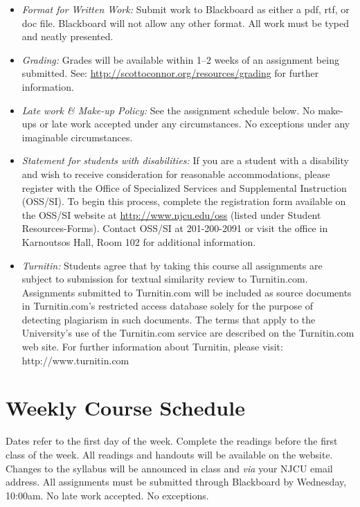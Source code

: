 \documentclass[article,oneside]{memoir}
\begin{document}
\begin{itemize}
\item \textit{Format for Written Work:} Submit work to Blackboard as either a pdf, rtf, or doc file. Blackboard will not allow any other format. All work must be typed and neatly presented. 


\item \textit{Grading:} Grades will be available within 1--2 weeks of an assignment being submitted. See: \href{http://scottoconnor.org/resources/grading}{http://scottoconnor.org/resources/grading} for further information.


\item \textit{Late work \& Make-up Policy:} See the assignment schedule below. No make-ups or late work accepted under any circumstances. No exceptions under any imaginable circumstances.


\item \textit{Statement for students with disabilities:} If you are a student
with a disability and wish to receive consideration for reasonable
accommodations, please register with the Office of Specialized Services
and Supplemental Instruction (OSS/SI). To begin this process, complete
the registration form available on the OSS/SI website at
\href{http://www.njcu.edu/oss}{http://www.njcu.edu/oss}
(listed under Student Resources-Forms). Contact OSS/SI at 201-200-2091
or visit the office in Karnoutsos Hall, Room 102 for additional
information.

\item \textit{Turnitin:} Students agree that by taking this course all assignments are subject to submission for textual similarity review to Turnitin.com. Assignments submitted to Turnitin.com will be included as source documents in Turnitin.com's restricted access database solely for the purpose of detecting plagiarism in such documents.  The terms that apply to the University’s use of the Turnitin.com service are described on the Turnitin.com web site.  For further information about Turnitin, please visit: http://www.turnitin.com 
\end{itemize}



\section{Weekly Course Schedule}
Dates refer to the first day of the week. Complete the readings before the first class of the week. All readings and handouts will be available on the website. Changes to the syllabus will be announced in class and \emph{via} your NJCU email address. All assignments must be submitted through Blackboard by Wednesday, 10:00am. No late work accepted. No exceptions. 
\end{document}
